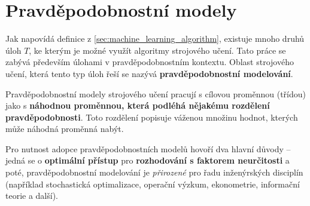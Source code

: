 \section{Pravděpodobnostní modely}
\label{sec:probabilstic_models}
Jak napovídá definice z \autoref{sec:machine_learning_algorithm}, existuje mnoho druhů úloh $T$, ke kterým je možné využít algoritmy strojového učení.
Tato práce se zabývá především úlohami v pravděpodobnostním kontextu. Oblast strojového učení, která tento typ úloh řeší se nazývá \textbf{pravděpodobnostní modelování}. 

Pravděpodobnostní modely strojového učení pracují s cílovou proměnnou (třídou) jako s \textbf{náhodnou proměnnou, která podléhá nějakému rozdělení pravděpodobnosti}.
Toto rozdělení popisuje váženou množinu hodnot, kterých může náhodná proměnná nabýt. \cite{Murphy2022}

Pro nutnost adopce pravděpodobnostních modelů hovoří dva hlavní důvody
– jedná se o \textbf{optimální přístup} pro \textbf{rozhodování s faktorem neurčitosti}
a poté, pravděpodobnostní modelování je \emph{přirozené} pro řadu inženýrských disciplín (například stochastická optimalizace, operační výzkum, ekonometrie, informační teorie a další). \cite{Murphy2022}

